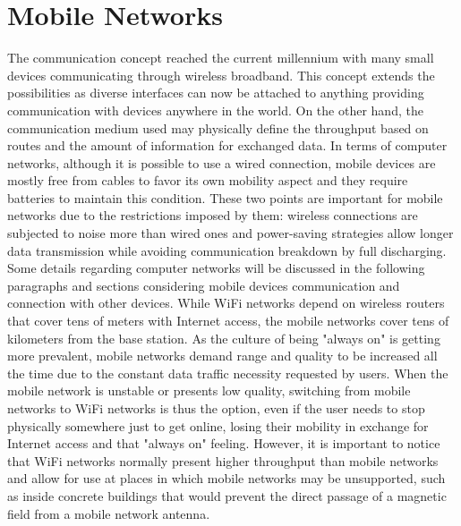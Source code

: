 \chapter{Mobile Networks}
\label{cap:mobilenetworks}


The communication concept reached the current millennium with many small devices communicating through wireless broadband.
This concept extends the possibilities as diverse interfaces can now be attached to anything providing communication with devices anywhere in the world.
On the other hand, the communication medium used may physically define the throughput based on routes and the amount of information for exchanged data.
In terms of computer networks, although it is possible to use a wired connection, mobile devices are mostly free from cables to favor its own mobility aspect and they require batteries to maintain this condition.
These two points are important for mobile networks due to the restrictions imposed by them:
wireless connections are subjected to noise more than wired ones and power-saving strategies allow longer data transmission while avoiding communication breakdown by full discharging.
Some details regarding computer networks will be discussed in the following paragraphs and sections considering mobile devices communication and connection with other devices. 
While WiFi networks depend on wireless routers that cover tens of meters with Internet access, the mobile networks cover tens of kilometers from the base station.
As the culture of being "always on" is getting more prevalent, mobile networks demand range and quality to be increased all the time due to the constant data traffic necessity requested by users.
When the mobile network is unstable or presents low quality, switching from mobile networks to WiFi networks is thus the option, even if the user needs to stop physically somewhere just to get online, losing their mobility in exchange for Internet access and that "always on" feeling.
However, it is important to notice that WiFi networks normally present higher throughput than mobile networks and allow for use at places in which mobile networks may be unsupported, such as inside concrete buildings that would prevent the direct passage of a magnetic field from a mobile network antenna.

